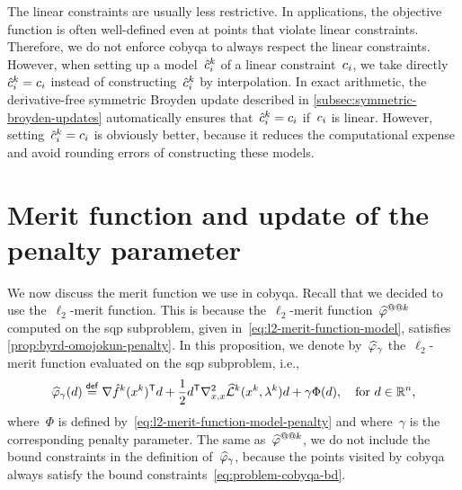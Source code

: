The linear constraints are usually less restrictive.
In applications, the objective function is often well-defined even at points that violate linear constraints.
Therefore, we do not enforce \gls{cobyqa} to always respect the linear constraints.
However, when setting up a model~$\conm[k]{i}$ of a linear constraint~$c_{i}$, we take directly~$\conm[k]{i} = \con{i}$ instead of constructing~$\conm[k]{i}$ by interpolation.
In exact arithmetic, the derivative-free symmetric Broyden update described in \cref{subsec:symmetric-broyden-updates} automatically ensures that~$\conm[k]{i} = \con{i}$ if~$c_{i}$ is linear. 
However, setting~$\conm[k]{i} = \con{i}$ is obviously better, because it reduces the computational expense and avoid rounding errors of constructing these models.

\section{Merit function and update of the penalty parameter}
\label{sec:cobyqa-merit-penalty}

We now discuss the merit function we use in \gls{cobyqa}.
Recall that we decided to use the~$\ell_2$-merit function.
This is because the~$\ell_2$-merit function~$\meritm[k]$ computed on the \gls{sqp} subproblem, given in~\cref{eq:l2-merit-function-model}, satisfies \cref{prop:byrd-omojokun-penalty}.
In this proposition, we denote by~$\meritm_{\gamma}$ the~$\ell_2$-merit function evaluated on the \gls{sqp} subproblem, i.e.,
\begin{equation*}
    \meritm_{\gamma}(\step) \eqdef \nabla \objm[k](\iter[k])^{\T} \step + \frac{1}{2} \step^{\T} \nabla_{x, x}^2 \lagm[k](\iter[k], \lm[k]) \step + \gamma \Phi(\step), \quad \text{for~$\step \in \R^n$,}
\end{equation*}
where~$\Phi$ is defined by~\cref{eq:l2-merit-function-model-penalty} and where~$\gamma$ is the corresponding penalty parameter.
The same as~$\meritm[k]$, we do not include the bound constraints in the definition of~$\meritm_{\gamma}$, because the points visited by \gls{cobyqa} always satisfy the bound constraints~\cref{eq:problem-cobyqa-bd}.

